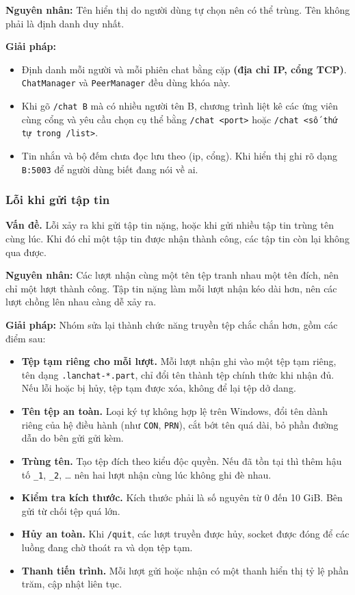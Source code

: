 \documentclass[a4paper,12pt]{article}
\newcommand{\code}[1]{\texttt{#1}}
\begin{document}
	\textbf{Nguyên nhân:} Tên hiển thị do người dùng tự chọn nên có thể trùng. Tên không phải là định danh duy nhất.
	
	\textbf{Giải pháp:}
	\begin{itemize}
		\item Định danh mỗi người và mỗi phiên chat bằng cặp \textbf{(địa chỉ IP, cổng TCP)}. \code{ChatManager} và \code{PeerManager} đều dùng khóa này.
		\item Khi gõ \code{/chat B} mà có nhiều người tên B, chương trình liệt kê các ứng viên cùng cổng và yêu cầu chọn cụ thể bằng \code{/chat <port>} hoặc \code{/chat <số thứ tự trong /list>}.
		\item Tin nhắn và bộ đếm chưa đọc lưu theo (ip, cổng). Khi hiển thị ghi rõ dạng \code{B:5003} để người dùng biết đang nói về ai.
	\end{itemize}
	
	\subsubsection{Lỗi khi gửi tập tin}
	\textbf{Vấn đề.} Lỗi xảy ra khi gửi tập tin nặng, hoặc khi gửi nhiều tập tin trùng tên cùng lúc. Khi đó chỉ một tập tin được nhận thành công, các tập tin còn lại không qua được.
	
	\textbf{Nguyên nhân:} Các lượt nhận cùng một tên tệp tranh nhau một tên đích, nên chỉ một lượt thành công. Tập tin nặng làm mỗi lượt nhận kéo dài hơn, nên các lượt chồng lên nhau càng dễ xảy ra.
	
	\textbf{Giải pháp:} Nhóm sửa lại thành chức năng truyền tệp chắc chắn hơn, gồm các điểm sau:
	\begin{itemize}
		\item \textbf{Tệp tạm riêng cho mỗi lượt.} Mỗi lượt nhận ghi vào một tệp tạm riêng, tên dạng \code{.lanchat-*.part}, chỉ đổi tên thành tệp chính thức khi nhận đủ. Nếu lỗi hoặc bị hủy, tệp tạm được xóa, không để lại tệp dở dang.
		\item \textbf{Tên tệp an toàn.} Loại ký tự không hợp lệ trên Windows, đổi tên dành riêng của hệ điều hành (như \code{CON}, \code{PRN}), cắt bớt tên quá dài, bỏ phần đường dẫn do bên gửi gửi kèm.
		\item \textbf{Trùng tên.} Tạo tệp đích theo kiểu độc quyền. Nếu đã tồn tại thì thêm hậu tố \code{\_1}, \code{\_2}, \ldots{} nên hai lượt nhận cùng lúc không ghi đè nhau.
		\item \textbf{Kiểm tra kích thước.} Kích thước phải là số nguyên từ 0 đến 10 GiB. Bên gửi từ chối tệp quá lớn.
		\item \textbf{Hủy an toàn.} Khi \code{/quit}, các lượt truyền được hủy, socket được đóng để các luồng đang chờ thoát ra và dọn tệp tạm.
		\item \textbf{Thanh tiến trình.} Mỗi lượt gửi hoặc nhận có một thanh hiển thị tỷ lệ phần trăm, cập nhật liên tục.
	\end{itemize}
	
\end{document}
